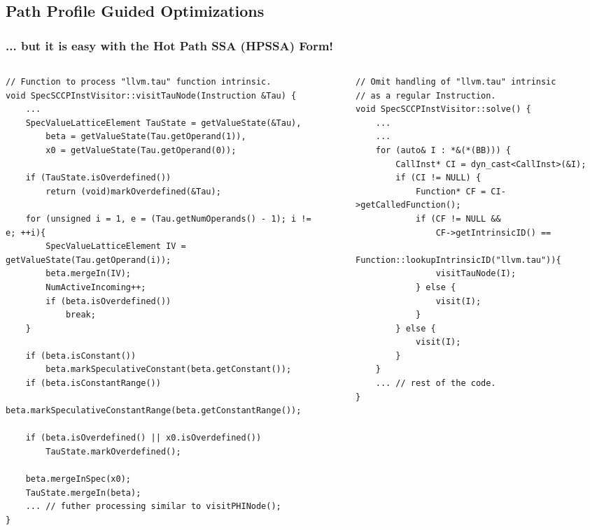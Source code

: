 \documentclass[aspectratio=169, compress]{beamer}
\begin{document}
\subsection{Path Profile Guided Optimizations}
{
	
}
{
	
}
\begin{frame}[fragile]
	\frametitle{... but it is easy with the Hot Path SSA (HPSSA) Form!}
	\begin{columns}
		\begin{column}{0.5\textwidth}
	\begin{verbatim}
// Function to process "llvm.tau" function intrinsic.
void SpecSCCPInstVisitor::visitTauNode(Instruction &Tau) {
	...
	SpecValueLatticeElement TauState = getValueState(&Tau), 
		beta = getValueState(Tau.getOperand(1)), 
		x0 = getValueState(Tau.getOperand(0));
		
	if (TauState.isOverdefined())
		return (void)markOverdefined(&Tau);
		
	for (unsigned i = 1, e = (Tau.getNumOperands() - 1); i != e; ++i){
		SpecValueLatticeElement IV = getValueState(Tau.getOperand(i));
		beta.mergeIn(IV);
		NumActiveIncoming++;
		if (beta.isOverdefined())
			break;
	}
	 
	if (beta.isConstant())
		beta.markSpeculativeConstant(beta.getConstant());
	if (beta.isConstantRange())
		beta.markSpeculativeConstantRange(beta.getConstantRange());

	if (beta.isOverdefined() || x0.isOverdefined())
		TauState.markOverdefined();
		
	beta.mergeInSpec(x0);
	TauState.mergeIn(beta);
	... // futher processing similar to visitPHINode();
}
\end{verbatim}
		\end{column}
	\begin{column}{0.01\textwidth} \end{column}
		\begin{column}{0.4\textwidth}  
			\begin{verbatim}
// Omit handling of "llvm.tau" intrinsic 
// as a regular Instruction.
void SpecSCCPInstVisitor::solve() {
	...
	...
	for (auto& I : *&(*(BB))) {
		CallInst* CI = dyn_cast<CallInst>(&I);
		if (CI != NULL) {
			Function* CF = CI->getCalledFunction();
			if (CF != NULL &&
				CF->getIntrinsicID() == 
			  Function::lookupIntrinsicID("llvm.tau")){
				visitTauNode(I);
			} else {
				visit(I);
			} 
		} else {
			visit(I);
		}
	}
	... // rest of the code.
}


\end{verbatim}
\end{column}
\end{columns}
\end{frame}
\end{document}
